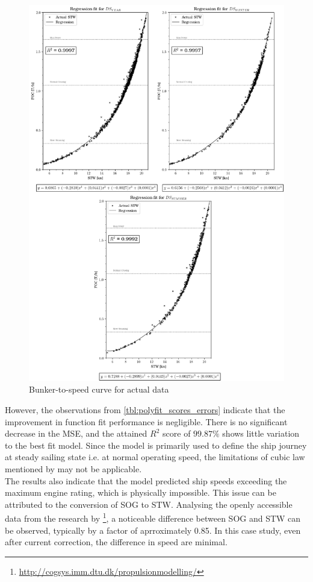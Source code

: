 \begin{figure}[h!]
    \centering
    \includegraphics[width=.9\linewidth]{02_figures/poly_act_combi.png}
    \caption{Bunker-to-speed curve for actual data}
    \label{fig:FOC_plot_act_combi}
\end{figure}

However, the observations from \cref{tbl:polyfit_scores_errors} indicate that the improvement in function fit performance is negligible. There is no significant decrease in the MSE, and the attained $R^2$ score of $99.87\%$ shows little variation to the best fit model. Since the model is primarily used to define the ship journey at steady sailing state i.e. at normal operating speed, the limitations of cubic law mentioned by  may not be applicable.\\

The results also indicate that the model predicted ship speeds exceeding the maximum engine rating, which is physically impossible. This issue can be attributed to the conversion of SOG to STW. Analysing the openly accessible data from the research by \footnote{\url{http://cogsys.imm.dtu.dk/propulsionmodelling/}}, a noticeable difference between SOG and STW can be observed, typically by a factor of aprroximately 0.85. In this case study, even after current correction, the difference in speed are minimal.\\ 


